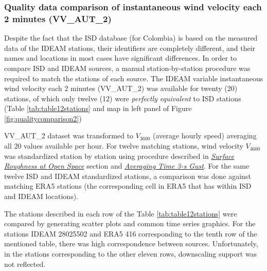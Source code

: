 \documentclass[12pt,oneside]{reedthesis}
\begin{document}
\hypertarget{quality-data-comparison-of-instantaneous-wind-velocity-each-2-minutes-vv_aut_2}{%
\subsubsection{Quality data comparison of instantaneous wind velocity each 2 minutes (VV\_AUT\_2)}\label{quality-data-comparison-of-instantaneous-wind-velocity-each-2-minutes-vv_aut_2}}

Despite the fact that the ISD database (for Colombia) is based on the measured data of the IDEAM stations, their identifiers are completely different, and their names and locations in most cases have significant differences. In order to compare ISD and IDEAM sources, a manual station-by-station procedure was required to match the stations of each source. The IDEAM variable instantaneous wind velocity each 2 minutes (VV\_AUT\_2) was available for twenty (20) stations, of which only twelve (12) were \emph{perfectly equivalent} to ISD stations (Table \ref{tab:table12stations} and map in left panel of Figure \ref{fig:qualitycomparison2})

VV\_AUT\_2 dataset was transformed to \(V_{3600}\) (average hourly speed) averaging all 20 values available per hour. For twelve matching stations, wind velocity \(V_{3600}\) was standardized station by station using procedure described in \emph{\protect\hyperlink{rmd-roughness}{Surface Roughness at Open Space}} section and \emph{\protect\hyperlink{rmd-gust}{Averaging Time 3-s Gust}}. For the same twelve ISD and IDEAM standardized stations, a comparison was done against matching ERA5 stations (the corresponding cell in ERA5 that has within ISD and IDEAM locations).

The stations described in each row of the Table \ref{tab:table12stations} were compared by generating scatter plots and common time series graphics. For the stations IDEAM 28025502 and ERA5 416 corresponding to the tenth row of the mentioned table, there was high correspondence between sources. Unfortunately, in the stations corresponding to the other eleven rows, downscaling support was not reflected.
\end{document}
